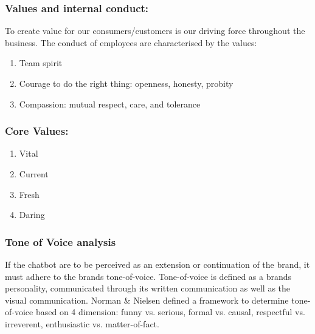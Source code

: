 \vspace{2,5mm}

        \subsubsection{Values and internal conduct:}
        
        To create value for our consumers/customers is our driving force throughout the business. The conduct of employees are characterised by the values:
        
        \begin{enumerate}
            \item Team spirit
            \item Courage to do the right thing: openness, honesty, probity
            \item Compassion: mutual respect, care, and tolerance
        \end{enumerate}

\vspace{2,5mm}

        \subsubsection{Core Values:}
        \begin{enumerate}
            \item Vital
            \item Current
            \item Fresh
            \item Daring
        \end{enumerate}
    
\vspace{5mm} %

        \subsubsection{Tone of Voice analysis}
    
        If the chatbot are to be perceived as an extension or continuation of the brand, it must adhere to the brands tone-of-voice. Tone-of-voice is defined as a brands personality, communicated through its written communication as well as the visual communication. Norman \& Nielsen defined a framework to determine tone-of-voice based on 4 dimension: funny vs. serious, formal vs. causal, respectful vs. irreverent, enthusiastic vs. matter-of-fact.
    
